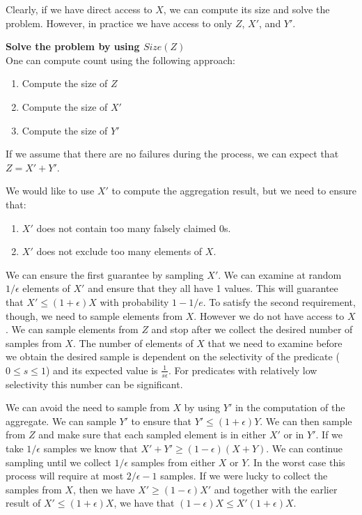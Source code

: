 \documentclass[11pt,twocolumn]{MyTightStyle}
\theoremstyle{plain}
\theoremstyle{definition}
\theoremstyle{remark}
\numberwithin{equation}{section}
\begin{document}
Clearly, if we have direct access to $X$, we can compute its size and
solve the problem. However,  in practice we have access to only $Z$, $X'$,
and $Y'$.

{\bf Solve the problem by using $Size(Z)$}\\
One can compute count using the following approach:
\begin{enumerate}
  \item Compute the size of $Z$
  \item Compute the size of $X'$
  \item Compute the size of $Y'$
\end{enumerate}

If we assume that there are no failures during the process, we can
expect that $Z = X' + Y'$.


We would like to use $X'$ to compute the aggregation result, but
we need to ensure that:

\begin{enumerate}
  \item $X'$ does not contain too many falsely claimed 0s.
  \item $X'$ does not exclude too many elements of $X$.
\end{enumerate}

We can ensure the first guarantee by sampling $X'$. We can examine at
random $1/\epsilon$ elements of $X'$ and ensure that they all have 1
values. This will guarantee that $X' \leq (1+\epsilon) X$ with probability
$1-1/e$. To satisfy the second requirement, though, we need to sample
elements from $X$. However we do not have access to $X$. We can sample
elements from $Z$ and stop after we collect the desired number of
samples from $X$. The number of elements of $X$ that we need to
examine before we obtain the desired sample is dependent on the
selectivity of the predicate ($0\leq s \leq 1$) and its expected value
is $\frac{1}{s\epsilon}$. For predicates with relatively low
selectivity this number can be significant.

We can avoid the need to sample from $X$ by using $Y'$ in the
computation of the aggregate. We can sample $Y'$ to ensure that $Y'
\leq (1+\epsilon)Y$. We can then sample from $Z$ and make sure that each
sampled element is in either $X'$ or in $Y'$. If we take $1/\epsilon$
samples we know that $X' + Y' \geq (1-\epsilon)(X+Y)$. We can continue
sampling until we collect $1/\epsilon$ samples from either $X$ or
$Y$. In the worst case this process will require at most $2/\epsilon
-1$ samples. If we were lucky to collect the samples from $X$, then we
have $X' \geq (1-\epsilon)X'$ and together with the earlier result of
$X' \leq (1+\epsilon) X$, we have that $(1-\epsilon)X \leq X'(1+\epsilon)X$. 
\end{document}
